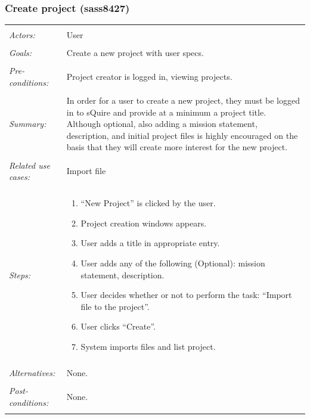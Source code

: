 \documentclass[11pt]{report}
\begin{document}
\subsubsection{Create project (sass8427)}
\begin{tabular}{ p{2cm} p{12cm} }
 \hline
 \\
 \textit{Actors:} & User \\ 
 \\
 \textit{Goals:} & Create a new project with user specs. \\
 \\
 \textit{Pre-conditions:} & Project creator is logged in, viewing projects.  \\
\\
 \textit{Summary:} & In order for a user to create a new project, they must be logged in to sQuire and provide at a minimum a project title. Although optional, also adding a mission statement, description, and initial project files is highly encouraged on the basis that they will create more interest for the new project. \\ 
 \\
 \textit{Related use cases:} & Import file \\ 
 \\
 \textit{Steps:} & \begin{enumerate}
  \item ``New Project'' is clicked by the user.
  \item Project creation windows appears. 
  \item User adds a title in appropriate entry. 
  \item User adds any of the following (Optional): mission statement, description.
  \item User decides whether or not to perform the task: ``Import file to the project''.
  \item User clicks ``Create''.
  \item System imports files and list project.
 \end{enumerate} \\
 \\
 \textit{Alternatives:} & None. \\
 \\
 \textit{Post-conditions:} & None. \\
 \\
\hline
\end{tabular}
\end{document}
